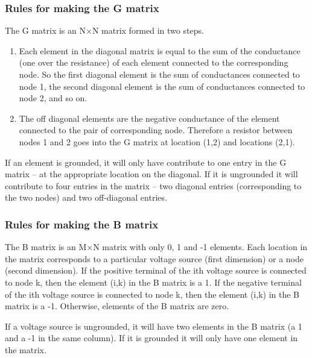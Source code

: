 \documentclass[10pt]{report}
\begin{document}
\subsubsection{Rules for making the G matrix}

The G matrix is an N$\times$N matrix formed in two steps.

\begin{enumerate}
\item
Each element in the diagonal matrix is equal to the sum of the
conductance (one over the resistance) of each element connected to the
corresponding node.  So the first diagonal element is the sum of
conductances connected to node 1, the second diagonal element is the
sum of conductances connected to node 2, and so on.
\item
The off diagonal elements are the negative conductance of the element
connected to the pair of corresponding node.  Therefore a resistor
between nodes 1 and 2 goes into the G matrix at location (1,2) and
locations (2,1).
\end{enumerate}

If an element is grounded, it will only have contribute to one entry
in the G matrix -- at the appropriate location on the diagonal.  If it
is ungrounded it will contribute to four entries in the matrix -- two
diagonal entries (corresponding to the two nodes) and two off-diagonal
entries.

\subsubsection{Rules for making the B matrix}

The B matrix is an M$\times$N matrix with only 0, 1 and -1 elements.
Each location in the matrix corresponds to a particular voltage source
(first dimension) or a node (second dimension).  If the positive
terminal of the ith voltage source is connected to node k, then the
element (i,k) in the B matrix is a 1.  If the negative terminal of the
ith voltage source is connected to node k, then the element (i,k) in
the B matrix is a -1.  Otherwise, elements of the B matrix are zero.

\addvspace{12pt}

If a voltage source is ungrounded, it will have two elements in the B
matrix (a 1 and a -1 in the same column).  If it is grounded it will
only have one element in the matrix.
\end{document}
